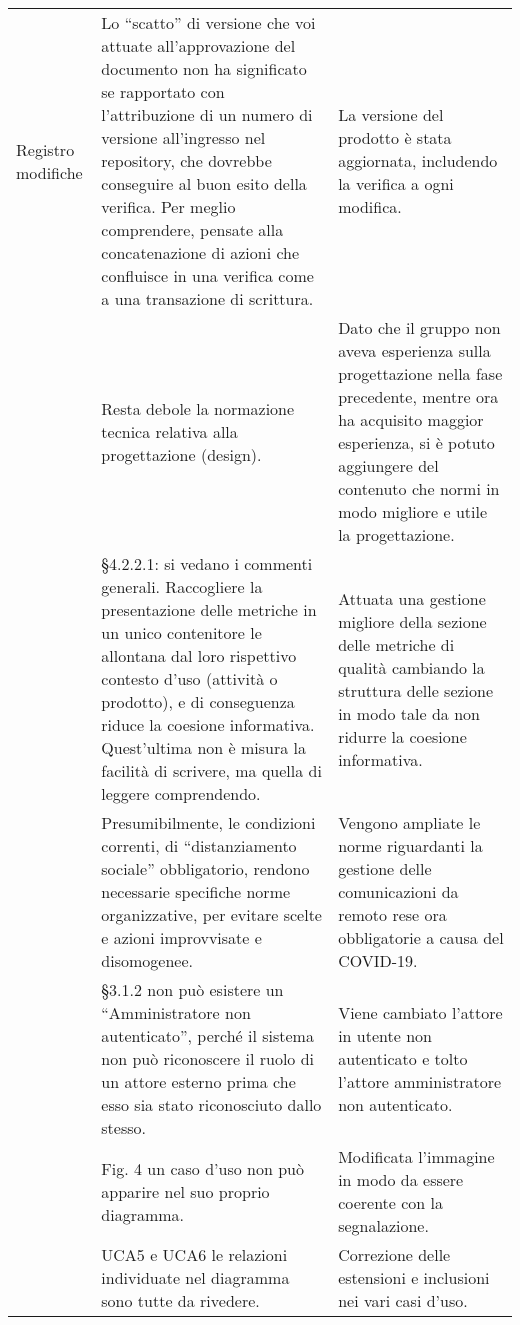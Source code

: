 {\begin{longtable}{ C{2cm} C{6cm} C{6cm}}
		Registro modifiche & Lo “scatto” di versione che voi attuate all’approvazione del documento non ha significato se rapportato con l’attribuzione di un numero di versione all’ingresso nel repository, che dovrebbe conseguire al buon esito della verifica. Per meglio comprendere, pensate alla concatenazione di azioni che confluisce in una verifica come a una transazione di scrittura. & La versione del prodotto è stata aggiornata, includendo la verifica a ogni modifica.\\
		
		\NdP & Resta debole la normazione tecnica relativa alla
		progettazione (design). & Dato che il gruppo non aveva esperienza sulla progettazione nella fase precedente, mentre ora ha acquisito maggior esperienza, si è potuto aggiungere del contenuto che normi in modo migliore e utile la progettazione.\\
		
		\NdP & §4.2.2.1: si vedano i commenti generali. Raccogliere
		la presentazione delle metriche in un unico contenitore le allontana dal loro
		rispettivo contesto d’uso (attività o prodotto), e di conseguenza riduce la
		coesione informativa. Quest’ultima non è misura la facilità di scrivere, ma
		quella di leggere comprendendo. & Attuata una gestione migliore della sezione delle metriche di qualità cambiando la struttura delle sezione in modo tale da non ridurre la coesione informativa.\\
		
		\NdP & Presumibilmente, le condizioni correnti, di “distanziamento sociale” obbligatorio, rendono necessarie specifiche norme organizzative, per evitare scelte e azioni improvvisate e disomogenee. & Vengono ampliate le norme riguardanti la gestione delle comunicazioni da remoto rese ora obbligatorie a causa del COVID-19.\\
		
		\AdR & §3.1.2 non può esistere un “Amministratore non autenticato”, perché il
		sistema non può riconoscere il ruolo di un attore esterno prima che esso sia
		stato riconosciuto dallo stesso. & Viene cambiato l'attore in utente non autenticato e tolto l'attore amministratore non autenticato.\\
		
		\AdR & Fig. 4 un caso d’uso non può apparire nel suo proprio diagramma. & Modificata l'immagine in modo da essere coerente con la segnalazione.\\
		
		\AdR & UCA5 e UCA6 le relazioni individuate nel diagramma sono tutte da rivedere. & Correzione delle estensioni e inclusioni nei vari casi d'uso.\\
		

\end{longtable}}
